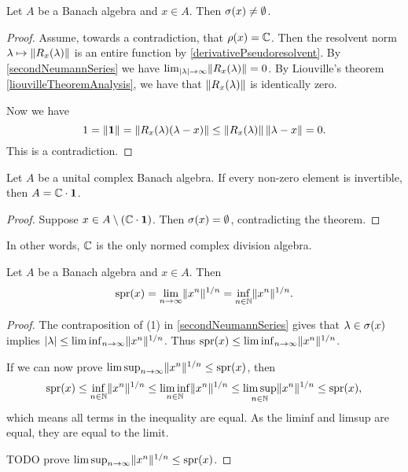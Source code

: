 \begin{proposition}
Let $A$ be a Banach algebra and $x\in A$. Then $\sigma(x)\neq \emptyset$.
\end{proposition}
\begin{proof}
Assume, towards a contradiction, that $\rho(x) = \mathbb{C}$. Then the resolvent norm $\lambda\mapsto \lVert R_x(\lambda)\rVert$ is an entire function by \ref{derivativePseudoresolvent}. By \ref{secondNeumannSeries} we have $\lim_{|\lambda|\to\infty}\lVert R_x(\lambda)\rVert = 0$. By Liouville's theorem \ref{liouvilleTheoremAnalysis}, we have that $\lVert R_x(\lambda)\rVert$ is identically zero.

Now we have
\[ 1 = \lVert\boldsymbol{\mathrm{1}}\rVert = \lVert R_x(\lambda)(\lambda-x)\rVert \leq \lVert R_x(\lambda)\rVert\,\lVert\lambda - x\rVert = 0. \]
This is a contradiction.
\end{proof}
\begin{corollary} \label{GelfandMazur}
Let $A$ be a unital complex Banach algebra. If every non-zero element is invertible, then $A=\mathbb{C}\cdot \boldsymbol{\mathrm{1}}$.
\end{corollary}
\begin{proof}
Suppose $x\in A\setminus (\mathbb{C}\cdot\boldsymbol{\mathrm{1}})$. Then $\sigma(x) = \emptyset$, contradicting the theorem.
\end{proof}
In other words, $\mathbb{C}$ is the only normed complex division algebra.


\begin{proposition} \label{spectralRadiusFormula}
Let $A$ be a Banach algebra and $x\in A$. Then
\[ \operatorname{spr}(x) = \lim_{n\to\infty}\lVert x^n\rVert^{1/n} = \inf_{n\in\mathbb{N}}\lVert x^n\rVert^{1/n}. \]
\end{proposition}
\begin{proof}
The contraposition of (1) in \ref{secondNeumannSeries} gives that $\lambda\in\sigma(x)$ implies $|\lambda| \leq \liminf_{n\to \infty}\lVert x^n\rVert^{1/n}$. Thus $\operatorname{spr}(x) \leq \liminf_{n\to \infty}\lVert x^n\rVert^{1/n}$.

If we can now prove $\limsup_{n\to\infty}\lVert x^n\rVert^{1/n}\leq \operatorname{spr}(x)$, then
\[ \operatorname{spr}(x) \leq \inf_{n\in\mathbb{N}}\lVert x^n\rVert^{1/n} \leq \liminf_{n\in\mathbb{N}}\lVert x^n\rVert^{1/n} \leq \limsup_{n\in\mathbb{N}}\lVert x^n\rVert^{1/n} \leq \operatorname{spr}(x), \]
which means all terms in the inequality are equal. As the liminf and limsup are equal, they are equal to the limit.

TODO prove $\limsup_{n\to\infty}\lVert x^n\rVert^{1/n}\leq \operatorname{spr}(x)$.
\end{proof}



